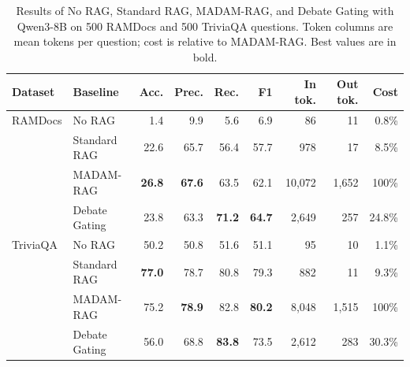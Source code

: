 \begin{table}[t]
\centering
\caption{Results of No RAG, Standard RAG, MADAM-RAG, and Debate Gating with Qwen3-8B on 500 RAMDocs and 500 TriviaQA questions. Token columns are mean tokens per question; cost is relative to MADAM-RAG. Best values are in bold.}
\label{tab:baseline-results}
\begin{tabular}{llrrrrrrr}
\toprule
Dataset & Baseline & Acc. & Prec. & Rec. & F1 & In tok. & Out tok. & Cost \\
\midrule
RAMDocs  & No RAG        & 1.4  & 9.9  & 5.6  & 6.9  & 86       & 11      & 0.8\% \\
         & Standard RAG  & 22.6 & 65.7 & 56.4 & 57.7 & 978      & 17      & 8.5\% \\
         & MADAM-RAG     & \textbf{26.8} & \textbf{67.6} & 63.5 & 62.1 & 10{,}072 & 1{,}652 & 100\% \\
         & Debate Gating & 23.8 & 63.3 & \textbf{71.2} & \textbf{64.7} & 2{,}649 & 257 & 24.8\% \\
\midrule
TriviaQA & No RAG        & 50.2 & 50.8 & 51.6 & 51.1 & 95       & 10      & 1.1\% \\
         & Standard RAG  & \textbf{77.0} & 78.7 & 80.8 & 79.3 & 882 & 11 & 9.3\% \\
         & MADAM-RAG     & 75.2 & \textbf{78.9} & 82.8 & \textbf{80.2} & 8{,}048 & 1{,}515 & 100\% \\
         & Debate Gating & 56.0 & 68.8 & \textbf{83.8} & 73.5 & 2{,}612 & 283 & 30.3\% \\
\bottomrule
\end{tabular}
\end{table}
